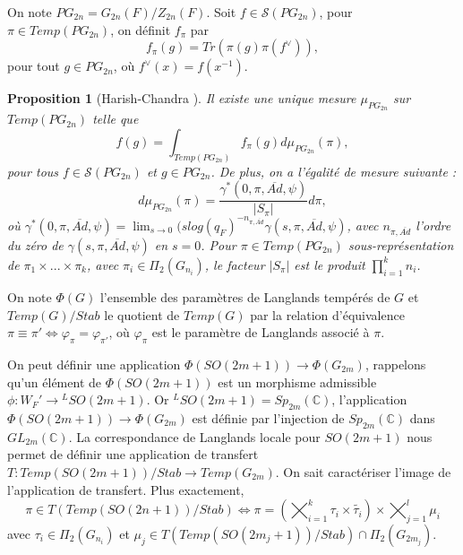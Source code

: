 \documentclass{amsart}
\newtheorem{proposition}{Proposition}[section]
\begin{document}
On note $PG_{2n} = G_{2n}(F)/Z_{2n}(F)$. Soit $f \in \mathcal{S}(PG_{2n})$, pour $\pi \in Temp(PG_{2n})$, on définit $f_\pi$ par
\begin{equation}
f_\pi(g) = Tr(\pi(g)\pi(f^\vee)),
\end{equation}
pour tout $g \in PG_{2n}$, où $f^{\vee}(x) = f(x^{-1})$.

\begin{proposition}[Harish-Chandra \cite{waldspurger}]
Il existe une unique mesure $\mu_{PG_{2n}}$ sur $Temp(PG_{2n})$ telle que
\begin{equation}
f(g) = \int_{Temp(PG_{2n})} f_{\pi}(g) d\mu_{PG_{2n}}(\pi),
\end{equation} 
pour tous $f \in \mathcal{S}(PG_{2n})$ et $g \in PG_{2n}$. De plus, on a l'égalité de mesure suivante :
\begin{equation}
\label{mesurePlanch}
d\mu_{PG_{2n}}(\pi) = \frac{\gamma^*(0, \pi, \overline{Ad}, \psi)}{|S_\pi|} d\pi,
\end{equation}
où $\gamma^*(0, \pi, \overline{Ad}, \psi) = \lim_{s \rightarrow 0} (s log(q_F)^{-n_{\pi, \overline{Ad}}} \gamma(s, \pi, \overline{Ad}, \psi)$, avec $n_{\pi, \overline{Ad}}$ l'ordre du zéro de $\gamma(s, \pi, \overline{Ad}, \psi)$ en $s=0$. Pour $\pi \in Temp(PG_{2n})$ sous-représentation de $\pi_1 \times ... \times \pi_k$, avec $\pi_i \in \Pi_{2}(G_{n_i})$, le facteur $|S_{\pi}|$ est le produit $\prod_{i=1}^k n_i$.
\end{proposition}

On note $\Phi(G)$ l'ensemble des paramètres de Langlands tempérés de $G$ et $Temp(G)/Stab$ le quotient de $Temp(G)$ par la relation d'équivalence $\pi \equiv \pi' \iff \varphi_\pi = \varphi_{\pi'}$, où $\varphi_\pi$ est le paramètre de Langlands associé à $\pi$.

On peut définir une application $\Phi(SO(2m+1)) \rightarrow \Phi(G_{2m})$, rappelons qu'un élément de $\Phi(SO(2m+1))$ est un morphisme admissible $\phi : W_F' \rightarrow {}^L SO(2m+1)$. Or ${}^L SO(2m+1) = Sp_{2m}(\mathbb{C})$, l'application $\Phi(SO(2m+1)) \rightarrow \Phi(G_{2m})$ est définie par l'injection de $Sp_{2m}(\mathbb{C})$ dans $GL_{2m}(\mathbb{C})$. La correspondance de Langlands locale pour $SO(2m+1)$ nous permet de définir une application de transfert $T : Temp(SO(2m+1))/Stab \rightarrow Temp(G_{2m})$. On sait caractériser l'image de l'application de transfert. Plus exactement,
\begin{equation}
\label{caracTransf}
\pi \in T(Temp(SO(2n+1))/Stab) \iff \pi = \left( \bigtimes_{i=1}^k \tau_i \times \widetilde{\tau_i} \right) \times \bigtimes_{j=1}^l \mu_i
\end{equation}
avec $\tau_i \in \Pi_2(G_{n_i})$ et $\mu_j \in T(Temp(SO(2m_j+1))/Stab) \cap \Pi_2(G_{2m_j})$.
\end{document}
